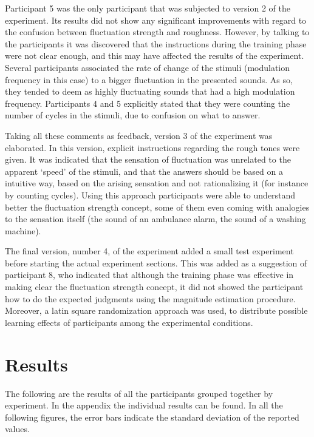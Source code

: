 \documentclass[a4paper]{article}
\begin{document}
Participant 5 was the only participant that was subjected to version 2 of the
experiment. Its results did not show any significant improvements with regard
to the confusion between fluctuation strength and roughness. However, by talking
to the participants it was discovered that the instructions during the training
phase were not clear enough, and this may have affected the results of the
experiment. Several participants associated the rate of change of the stimuli
(modulation frequency in this case) to a bigger fluctuation in the presented
sounds. As so, they tended to deem as highly fluctuating sounds that had a high
modulation frequency. Participants 4 and 5 explicitly stated that they were
counting the number of cycles in the stimuli, due to confusion on what to
answer.

Taking all these comments as feedback, version 3 of the experiment was
elaborated. In this version, explicit instructions regarding the rough tones
were given. It was indicated that the sensation of fluctuation was unrelated to
the apparent `speed' of the stimuli, and that the answers should be based on a
intuitive way, based on the arising sensation and not rationalizing it (for
instance by counting cycles). Using this approach participants were able to
understand better the fluctuation strength concept, some of them even coming
with analogies to the sensation itself (the sound of an ambulance alarm, the
sound of a washing machine).

The final version, number 4, of the experiment added a small test experiment
before starting the actual experiment sections. This was added as a suggestion
of participant 8, who indicated that although the training phase was effective
in making clear the fluctuation strength concept, it did not showed the
participant how to do the expected judgments using the magnitude estimation
procedure. Moreover, a latin square randomization approach was used, to
distribute possible learning effects of participants among the experimental
conditions.


\section{Results} %
\label{sec:results}

The following are the results of all the participants grouped together by
experiment. In the appendix the individual results can be found. In all the
following figures, the error bars indicate the standard deviation of the
reported values.
\end{document}
